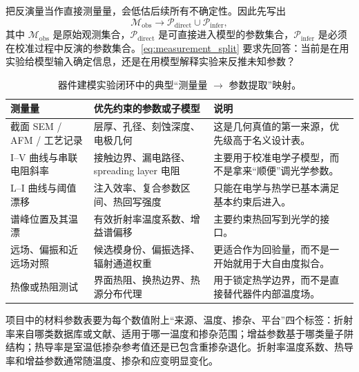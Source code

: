 把反演量当作直接测量量，会低估后续所有不确定性。因此先写出
\begin{equation}
\mathcal{M}_{\mathrm{obs}}
\longrightarrow
\mathcal{P}_{\mathrm{direct}}
\cup
\mathcal{P}_{\mathrm{infer}},
\label{eq:measurement_split}
\end{equation}
其中 $\mathcal{M}_{\mathrm{obs}}$ 是原始观测集合，$\mathcal{P}_{\mathrm{direct}}$ 是可直接进入模型的参数集合，$\mathcal{P}_{\mathrm{infer}}$ 是必须在校准过程中反演的参数集合。\cref{eq:measurement_split} 要求先回答：当前是在用实验给模型输入确定信息，还是在用模型解释实验来反推未知参数？

\begin{table}[htbp]
  \centering
  \footnotesize
  \caption{器件建模实验闭环中的典型“测量量 $\rightarrow$ 参数提取”映射。}
  \label{tab:measurement_to_parameter}
  \begin{tabularx}{\textwidth}{@{}p{3.1cm}p{3.3cm}Y@{}}
    \toprule
    测量量 & 优先约束的参数或子模型 & 说明 \\
    \midrule
    截面 SEM / AFM / 工艺记录 & 层厚、孔径、刻蚀深度、电极几何 & 这是几何真值的第一来源，优先级高于名义设计表。 \\
    I--V 曲线与串联电阻斜率 & 接触边界、漏电路径、spreading layer 电阻 & 主要用于校准电学子模型，而不是拿来“顺便”调光学参数。 \\
    L--I 曲线与阈值漂移 & 注入效率、复合参数区间、热回写强度 & 只能在电学与热学已基本满足基本约束后进入。 \\
    谱峰位置及其温漂 & 有效折射率温度系数、增益谱偏移 & 主要约束热回写到光学的接口。 \\
    远场、偏振和近远场对照 & 候选模身份、偏振选择、辐射通道权重 & 更适合作为回验量，而不是一开始就用于大自由度拟合。 \\
    热像或热阻测试 & 界面热阻、换热边界、热源分布代理 & 用于锁定热学边界，而不是直接替代器件内部温度场。 \\
    \bottomrule
  \end{tabularx}
\end{table}

项目中的材料参数表要为每个数值附上“来源、温度、掺杂、平台”四个标签：折射率来自哪类数据库或文献、适用于哪一温度和掺杂范围；增益参数基于哪类量子阱结构；热导率是室温低掺杂参考值还是已包含重掺杂退化。折射率温度系数、热导率和增益参数通常随温度、掺杂和应变明显变化。

